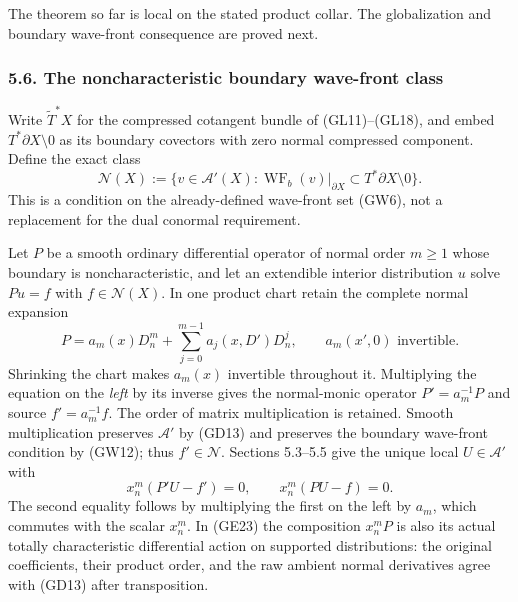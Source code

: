 \documentclass[
  11pt,
]{article}
\begin{document}
The theorem so far is local on the stated product collar. The
globalization and boundary wave-front consequence are proved next.

\subsubsection{5.6. The noncharacteristic boundary wave-front
class}\label{the-noncharacteristic-boundary-wave-front-class}

Write \(\widetilde T^*X\) for the compressed cotangent bundle of
(GL11)--(GL18), and embed \(T^*\partial X\setminus0\) as its boundary
covectors with zero normal compressed component. Define the exact class
\[
 \mathcal N(X)
  :=\{v\in\mathcal A'(X):
       \operatorname{WF}_b(v)|_{\partial X}
       \subset T^*\partial X\setminus0\}.
 \tag{GE21}
\] This is a condition on the already-defined wave-front set (GW6), not
a replacement for the dual conormal requirement.

Let \(P\) be a smooth ordinary differential operator of normal order
\(m\ge1\) whose boundary is noncharacteristic, and let an extendible
interior distribution \(u\) solve \(Pu=f\) with \(f\in\mathcal N(X)\).
In one product chart retain the complete normal expansion \[
 P=a_m(x)D_n^m+
       \sum_{j=0}^{m-1}a_j(x,D')D_n^j,
 \qquad a_m(x',0)\text{ invertible}.
 \tag{GE22}
\] Shrinking the chart makes \(a_m(x)\) invertible throughout it.
Multiplying the equation on the \emph{left} by its inverse gives the
normal-monic operator \(P'=a_m^{-1}P\) and source \(f'=a_m^{-1}f\). The
order of matrix multiplication is retained. Smooth multiplication
preserves \(\mathcal A'\) by (GD13) and preserves the boundary
wave-front condition by (GW12); thus \(f'\in\mathcal N\). Sections
5.3--5.5 give the unique local \(U\in\mathcal A'\) with \[
 x_n^m(P'U-f')=0,
 \qquad x_n^m(PU-f)=0.
 \tag{GE23}
\] The second equality follows by multiplying the first on the left by
\(a_m\), which commutes with the scalar \(x_n^m\). In (GE23) the
composition \(x_n^mP\) is also its actual totally characteristic
differential action on supported distributions: the original
coefficients, their product order, and the raw ambient normal
derivatives agree with (GD13) after transposition.
\end{document}
